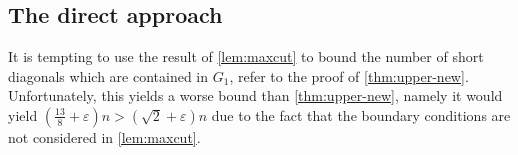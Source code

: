 \documentclass[nolineno,a4paper,USenglish,cleveref,autoref,thm-restate]
{socg}
\begin{document}
\subsection{The direct approach}
It is tempting to use the result of \cref{lem:maxcut} to bound the number of short diagonals which are contained in $G_1$, refer to the proof of \cref{thm:upper-new}. Unfortunately, this yields a worse bound than \cref{thm:upper-new}, namely it would yield $(\frac{13}{8}+\varepsilon)n > (\sqrt{2}+\varepsilon)n$ due to the fact that the boundary conditions are not considered in \cref{lem:maxcut}.

\end{document}
